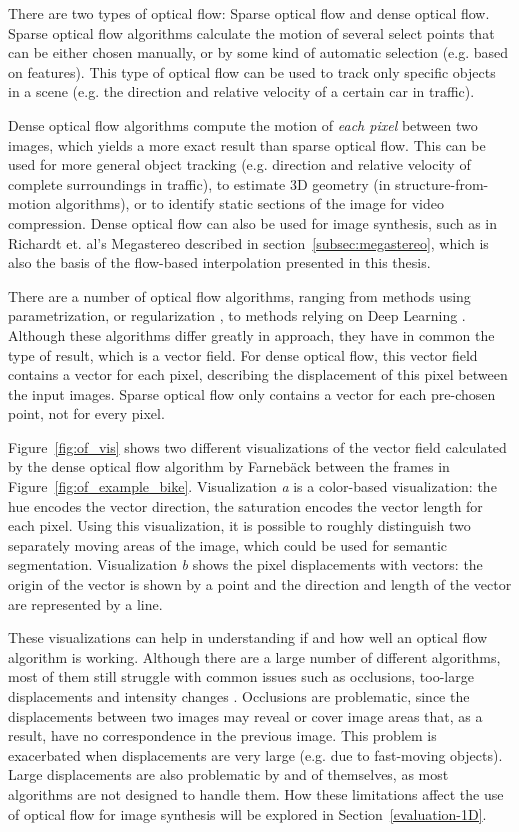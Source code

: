 There are two types of optical flow: Sparse optical flow and dense optical flow. Sparse optical flow algorithms calculate the motion of several select points that can be either chosen manually, or by some kind of automatic selection (e.g. based on features). This type of optical flow can be used to track only specific objects in a scene (e.g. the direction and relative velocity of a certain car in traffic).

Dense optical flow algorithms compute the motion of \emph{each pixel} between two images, which yields a more exact result than sparse optical flow. This can be used for more general object tracking (e.g. direction and relative velocity of complete surroundings in traffic), to estimate 3D geometry (in structure-from-motion algorithms), or to identify static sections of the image for video compression. Dense optical flow can also be used for image synthesis, such as in Richardt et. al's Megastereo \cite{megastereo} described in section~\ref{subsec:megastereo}, which is also the basis of the flow-based interpolation presented in this thesis.

There are a number of optical flow algorithms, ranging from methods using parametrization, or regularization \cite{of-survey}, to methods relying on Deep Learning \cite{of-deep}. Although these algorithms differ greatly in approach, they have in common the type of result, which is a vector field. For dense optical flow, this vector field contains a vector for each pixel, describing the displacement of this pixel between the input images. Sparse optical flow only contains a vector for each pre-chosen point, not for every pixel.

Figure~\ref{fig:of_vis} shows two different visualizations of the vector field calculated by the dense optical flow algorithm by Farneb\"ack \cite{farneback} between the frames in Figure~\ref{fig:of_example_bike}. Visualization \emph{a} is a color-based visualization: the hue encodes the vector direction, the saturation encodes the vector length for each pixel. Using this visualization, it is possible to roughly distinguish two separately moving areas of the image, which could be used for semantic segmentation. Visualization \emph{b} shows the pixel displacements with vectors: the origin of the vector is shown by a point and the direction and length of the vector are represented by a line.

These visualizations can help in understanding if and how well an optical flow algorithm is working. Although there are a large number of different algorithms, most of them still struggle with common issues such as occlusions, too-large displacements and intensity changes \cite{of-survey}. Occlusions are problematic, since the displacements between two images may reveal or cover image areas that, as a result, have no correspondence in the previous image. This problem is exacerbated when displacements are very large (e.g. due to fast-moving objects). Large displacements are also problematic by and of themselves, as most algorithms are not designed to handle them. How these limitations affect the use of optical flow for image synthesis will be explored in Section~\ref{evaluation-1D}.

